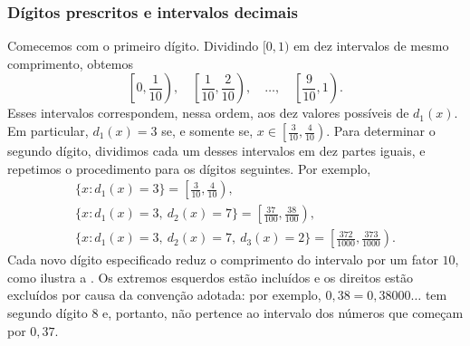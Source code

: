 \documentclass[12pt,portuguese]{article}
\theoremstyle{definition}
\theoremstyle{plainexercise}
\theoremstyle{starredexercise}
\theoremstyle{definition}
\begin{document}
\subsubsection{Dígitos prescritos e intervalos decimais}

Comecemos com o primeiro dígito. Dividindo $[0,1)$ em dez intervalos de mesmo
comprimento, obtemos
\[
\left[0,\frac{1}{10}\right),\quad
\left[\frac{1}{10},\frac{2}{10}\right),\quad\ldots,\quad
\left[\frac{9}{10},1\right).
\]
Esses intervalos correspondem, nessa ordem, aos dez valores possíveis de
$d_1(x)$. Em particular, $d_1(x)=3$ se, e somente se,
$x\in\left[\frac{3}{10},\frac{4}{10}\right)$. Para determinar o segundo dígito, dividimos cada um
desses intervalos em dez partes iguais, e repetimos o procedimento para os
dígitos seguintes. Por exemplo,
\begin{gather*}
\{x:d_1(x)=3\}
=\left[\frac{3}{10},\frac{4}{10}\right),\\[0.4cm]
\{x:d_1(x)=3,\ d_2(x)=7\}
=\left[\frac{37}{100},\frac{38}{100}\right),\\[0.4cm]
\{x:d_1(x)=3,\ d_2(x)=7,\ d_3(x)=2\}
=\left[\frac{372}{1000},\frac{373}{1000}\right).
\end{gather*}
Cada novo dígito especificado reduz o comprimento do intervalo por um fator
$10$, como ilustra a . Os extremos esquerdos
estão incluídos e os direitos estão excluídos por causa da convenção adotada:
por exemplo, $0{,}38=0{,}38000\ldots$ tem segundo dígito $8$ e, portanto, não
pertence ao intervalo dos números que começam por $0{,}37$.
\end{document}
